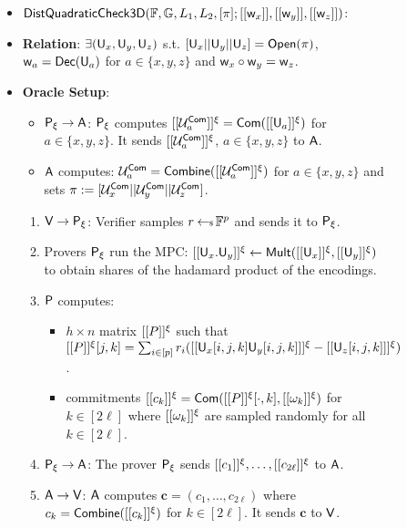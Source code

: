 \begin{figure}[h!]
\centering
\begin{framed}
\begin{itemize}
\item $\mathsf{DistQuadraticCheck3D}(\mathbb{F},\mathbb{G},L_1,L_2,[\pi];[[\mathsf{w}_x]],[[\mathsf{w}_y]],[[\mathsf{w}_z]])$:
\item {\bf Relation}: $\exists (\mathsf{U}_x,\mathsf{U}_y,\mathsf{U}_z)$
s.t. $[\mathsf{U}_x||\mathsf{U}_y||\mathsf{U}_z]=\mathsf{Open}(\pi)$, $\mathsf{w}_{a}=\mathsf{Dec}(\mathsf{U}_a)$ for $a\in
\{x,y,z\}$ and $\mathsf{w}_x\circ \mathsf{w}_y = \mathsf{w}_z$.
\item {\bf Oracle Setup}: 
\begin{itemize}
\item $\mathsf{P}_\xi\rightarrow\mathsf{A}$: $\mathsf{P}_\xi$ computes $[[{\mathcal{U}^{\mathsf{Com}}_a}]]^\xi=\mathsf{Com}([[{\mathsf{U}_a}]]^\xi)$ 
for $a\in \{x,y,z\}$. It sends $[[{\mathcal{U}^{\mathsf{Com}}_a}]]^\xi$, $a\in \{x,y,z\}$ to $\mathsf{A}$.
\item $\mathsf{A}$ computes: $\mathcal{U}^{\mathsf{Com}}_a=\mathsf{Combine}([[{\mathcal{U}^{\mathsf{Com}}_a}]]^\xi)$ for $a\in
\{x,y,z\}$ and sets $\pi := [\mathcal{U}^{\mathsf{Com}}_x||\mathcal{U}^{\mathsf{Com}}_y||\mathcal{U}^{\mathsf{Com}}_z]$.
\end{itemize}
\begin{enumerate}[{\rm 1.}]
\item $\mathsf{V}\rightarrow\mathsf{P}_\xi$: Verifier samples $r\hskip2.3pt{\gets\!\!\mbox{\tiny${\$}$\normalsize}}\,\mathbb{F}^p$ and sends
it to $\mathsf{P}_\xi$.
\item Provers $\mathsf{P}_\xi$ run the MPC: $[[{\mathsf{U}_x.\mathsf{U}_y}]]^\xi\leftarrow
\mathsf{Mult}([[{\mathsf{U}_x}]]^\xi,[[{\mathsf{U}_y}]]^\xi)$ to obtain shares of the hadamard
product of the encodings.
\item $\mathsf{P}$ computes:
	\begin{itemize}
	\item $h\times n$ matrix $[[{P}]]^\xi$ such that 
	$[[{P}]]^\xi[j,k]=\sum_{i\in
[p]}r_i([[{\mathsf{U}_x[i,j,k]\mathsf{U}_y[i,j,k]}]]^\xi-[[{\mathsf{U}_z[i,j,k]}]]^\xi)$.
	\item commitments $[[{c_k}]]^\xi=\mathsf{Com}([[{P}]]^\xi[\cdot,k],[[{\omega_k}]]^\xi)$ for
$k\in [2\ell]$ where $[[{\omega_k}]]^\xi$ are sampled randomly for all $k\in
[2\ell]$.
	\end{itemize}
\item $\mathsf{P}_\xi\rightarrow\mathsf{A}$: The prover $\mathsf{P}_\xi$ sends
$[[{c_1}]]^\xi,\ldots,[[{c_{2\ell}}]]^\xi$ to $\mathsf{A}$.
\item $\mathsf{A}\rightarrow \mathsf{V}$: $\mathsf{A}$ computes $\bm{c}=(c_1,\ldots,c_{2\ell})$ where
$c_k=\mathsf{Combine}([[{c_k}]]^\xi)$ for $k\in [2\ell]$. It sends $\bm{c}$ to $\mathsf{V}$.


\end{enumerate}
\end{itemize}
\end{framed}
\end{figure}
